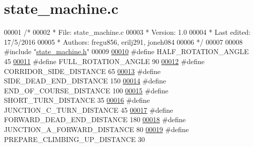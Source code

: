 \hypertarget{state__machine_8c_source}{}\section{state\+\_\+machine.\+c}
\label{state__machine_8c_source}

\begin{DoxyCode}
00001 \textcolor{comment}{/*}
00002 \textcolor{comment}{ *        File: state\_machine.c}
00003 \textcolor{comment}{ *     Version: 1.0}
00004 \textcolor{comment}{ * Last edited: 17/5/2016 }
00005 \textcolor{comment}{ *     Authors: fregu856, erilj291, joneh084}
00006 \textcolor{comment}{ */} 
00007 
00008 \textcolor{preprocessor}{#include "\hyperlink{state__machine_8h}{state\_machine.h}"}
00009 
\hypertarget{state__machine_8c_source.tex_l00010}{}\hyperlink{state__machine_8c_a5776a711f0156180fe5efb79c9ffc24f}{00010} \textcolor{preprocessor}{#define HALF\_ROTATION\_ANGLE 45          }
\hypertarget{state__machine_8c_source.tex_l00011}{}\hyperlink{state__machine_8c_a40718a26b2b107afdc38533db41cc0a3}{00011} \textcolor{preprocessor}{#define FULL\_ROTATION\_ANGLE 90          }
\hypertarget{state__machine_8c_source.tex_l00012}{}\hyperlink{state__machine_8c_a201d56046ddf552d57b4862e0ec07a10}{00012} \textcolor{preprocessor}{#define CORRIDOR\_SIDE\_DISTANCE 65       }
\hypertarget{state__machine_8c_source.tex_l00013}{}\hyperlink{state__machine_8c_a31ba7e3e0116f665d5825f669052ed09}{00013} \textcolor{preprocessor}{#define SIDE\_DEAD\_END\_DISTANCE 150      }
\hypertarget{state__machine_8c_source.tex_l00014}{}\hyperlink{state__machine_8c_a9a1286b84f437e1c90d21ffc833a8b79}{00014} \textcolor{preprocessor}{#define END\_OF\_COURSE\_DISTANCE 100      }
\hypertarget{state__machine_8c_source.tex_l00015}{}\hyperlink{state__machine_8c_adf843098ef425aa129f5ff16d879f7f2}{00015} \textcolor{preprocessor}{#define SHORT\_TURN\_DISTANCE 35          }
\hypertarget{state__machine_8c_source.tex_l00016}{}\hyperlink{state__machine_8c_a8f7e1b7ccc92504f03ca42fb3e76e7d4}{00016} \textcolor{preprocessor}{#define JUNCTION\_C\_TURN\_DISTANCE 45}
\hypertarget{state__machine_8c_source.tex_l00017}{}\hyperlink{state__machine_8c_a8118fdbf1a36265000f2d42844e10747}{00017} \textcolor{preprocessor}{#define FORWARD\_DEAD\_END\_DISTANCE 180   }
\hypertarget{state__machine_8c_source.tex_l00018}{}\hyperlink{state__machine_8c_ada224a95ca04ac21b410ef6e23814eea}{00018} \textcolor{preprocessor}{#define JUNCTION\_A\_FORWARD\_DISTANCE 80  }
\hypertarget{state__machine_8c_source.tex_l00019}{}\hyperlink{state__machine_8c_a1bdeb86204e23b0e597ffe87d6579167}{00019} \textcolor{preprocessor}{#define PREPARE\_CLIMBING\_UP\_DISTANCE 30 }

\end{DoxyCode}
